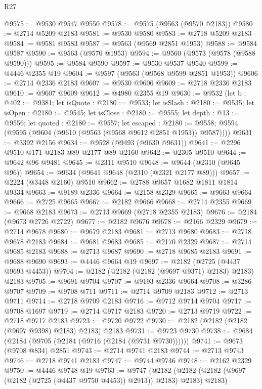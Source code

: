 \begin{lexlean}{R27}
\begin{coremodule}
@9575 := @9530 @9547 @9550
@9578 := @9575 (@9563 (@9570 @2183))
@9580 := @2714 @5209 @2183
@9581 := @9530 @9580
@9583 := @2718 @5209 @2183
@9584 := @9581 @9583
@9587 := @9563 (@9569 @2851 @1953)
@9588 := @9584 @9587
@9590 := @9563 (@9570 @1953)
@9594 := @9560 (@9573 (@9578 (@9588 @9590)))
@9595 := @9584 @9590
@9597 := @9530 @9537 @9540
@9599 := @4446 @2355 @19
@9604 := @9597 (@9563 (@9568 @9599 @2851 @1953))
@9606 := @2714 @2336 @2183
@9607 := @9530 @9606
@9609 := @2718 @2336 @2183
@9610 := @9607 @9609
@9612 := @4980 @2355 @19
@9630 := @9532
    (let b : @402 := @9381;
    let isQuote : @2180 := @9533;
    let isSlash : @2180 := @9535;
    let isOpen : @2180 := @9545;
    let isClose : @2180 := @9555;
    let depth : @13 := @9556;
    let quoted : @2180 := @9557;
    let escaped : @2180 := @9558;
    @9594 (@9595 (@9604 (@9610 (@9563 (@9568 @9612 @2851 @1953)) @9587))))
@9631 := @3392 @2156
@9634 := @9528 (@9493 (@9630 @9631))
@9641 := @2296 @9510 @171 @2183 @89 @2177 @89 @2160
@9642 := @2305 @9510
@9644 := @9642 @96 @9481
@9645 := @2311 @9510
@9648 := @9644 (@2310 (@9645 @96))
@9654 := @9634 (@9641 @9648 (@2310 (@2321 @2177 @89)))
@9657 := @2224 (@3448 @2160) @9510
@9662 := @2788 @9657 @1682 @1811 @1814 @9334
@9663 := @9189 @2336
@9664 := @2158 @2329
@9665 := @9663 @9664
@9666 := @2725 @9665
@9667 := @2182 @9666
@9668 := @2714 @2355
@9669 := @9668 @2183
@9673 := @2713 @9669 (@2718 @2355 @2183)
@9676 := @2184 (@9673 @2726 @2722)
@9677 := @2182 @9676
@9678 := @2166 @2329
@9679 := @2714 @9678
@9680 := @9679 @2183
@9681 := @2713 @9680
@9683 := @2718 @9678 @2183
@9684 := @9681 @9683
@9685 := @2170 @2329
@9687 := @2714 @9685 @2183
@9688 := @2713 @9687
@9690 := @2718 @9685 @2183
@9691 := @9688 @9690
@9693 := @4446 @9664 @19
@9697 := @2182 (@2725 (@4437 @9693 @4453))
@9704 := @2182 (@2182 (@2182 (@9697 @9371) @2183) @2183) @2183
@9705 := @9691 @9704
@9707 := @9193 @2336 @9664
@9708 := @3286 @9707
@9709 := @9708 @711
@9711 := @2714 @9709 @2183
@9712 := @2713 @9711
@9714 := @2718 @9709 @2183
@9716 := @9712 @9714 @9704
@9717 := @9708 @1697
@9719 := @2714 @9717 @2183
@9720 := @2713 @9719
@9722 := @2718 @9717 @2183
@9723 := @9720 @9722
@9730 := @2182 (@2182 (@2182 (@9697 @9398) @2183) @2183) @2183
@9731 := @9723 @9730
@9738 := @9684 (@2184 (@9705 (@2184 (@9716 (@2184 (@9731 @9730))))))
@9741 := @9673 (@9708 @834) @2851
@9743 := @2714 @9741 @2183
@9744 := @2713 @9743
@9746 := @2718 @9741 @2183
@9747 := @9744 @9746
@9748 := @2162 @2329
@9750 := @4446 @9748 @19
@9763 := @9747
    (@2182 (@2182 (@2182 (@9697 (@2182 (@2725 (@4437 @9750 @4453)) @2913)) @2183) @2183) @2183)

\end{coremodule}
\end{lexlean}
